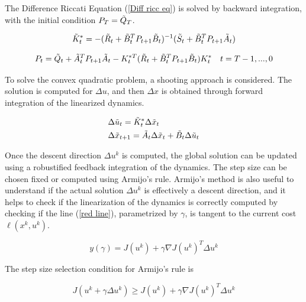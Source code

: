 The Difference Riccati Equation (\ref{Diff ricc eq}) is solved by backward integration, with the initial condition $P_T = \Tilde{Q}_T$.

\begin{equation}
    \Tilde{K}_t^* = -(\Tilde{R}_t + \Tilde{B}_t^T P_{t+1} \Tilde{B}_t)^{-1}(\Tilde{S}_t + \Tilde{B}_t^T P_{t+1} \Tilde{A}_t)
\end{equation}

\begin{equation} \label{Diff ricc eq}
    P_t = \Tilde{Q}_t + \Tilde{A}_t^T P_{t+1} \Tilde{A}_t - K_t^{*T}(\Tilde{R}_t + \Tilde{B}_t^T P_{t+1} \Tilde{B}_t )K_t^* \quad t = T-1,...,0
\end{equation}

To solve the convex quadratic problem, a shooting approach is considered. The solution is computed for $\Delta u$, and then $\Delta x$ is obtained through forward integration of the linearized dynamics.

\begin{equation}
    \begin{aligned}
        &\Delta\Tilde{u}_t = \Tilde{K}_t^*\Delta\Tilde{x}_t\\
        &\Delta\Tilde{x}_{t+1} = \Tilde{A}_t\Delta\Tilde{x}_t + \Tilde{B}_t\Delta\Tilde{u}_t
    \end{aligned}
\end{equation}

Once the descent direction $\Delta u^k$ is computed, the global solution can be updated using a robustified feedback integration of the dynamics. The step size can be chosen fixed or computed using Armijo's rule. Armijo's method is also useful to understand if the actual solution $\Delta u^k$ is effectively a descent direction, and it helps to check if the linearization of the dynamics is correctly computed by checking if the line (\ref{red line}), parametrized by $\gamma$, is tangent to the current cost $\ell(x^k,u^k)$.

\begin{equation} \label{red line}
    y(\gamma) = J(u^k) + \gamma \nabla J(u^k)^T\Delta u^k
\end{equation}

The step size selection condition for Armijo's rule is

\begin{equation}
    J(u^k + \gamma\Delta u^k) \geq J(u^k) + \gamma \nabla J(u^k)^T\Delta u^k
\end{equation}

